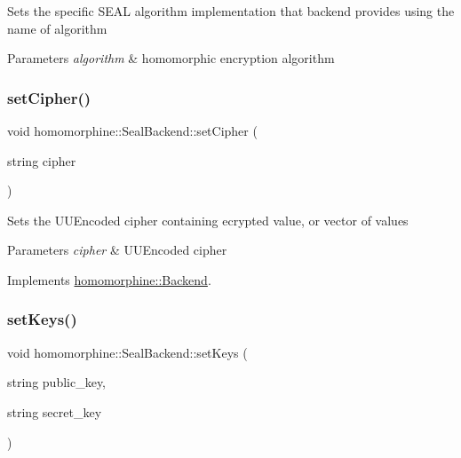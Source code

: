 Sets the specific S\+E\+AL algorithm implementation that backend provides using the name of algorithm


\begin{DoxyParams}{Parameters}
{\em algorithm} & homomorphic encryption algorithm \\
\hline
\end{DoxyParams}
\mbox{\label{classhomomorphine_1_1_seal_backend_a866b58e41809d68d4c6ed8c3afb27712}} 
\subsubsection{\texorpdfstring{setCipher()}{setCipher()}}
{\footnotesize\ttfamily void homomorphine\+::\+Seal\+Backend\+::set\+Cipher (\begin{DoxyParamCaption}\item[{string}]{cipher }\end{DoxyParamCaption})\hspace{0.3cm}{\ttfamily [virtual]}}

Sets the U\+U\+Encoded cipher containing ecrypted value, or vector of values


\begin{DoxyParams}{Parameters}
{\em cipher} & U\+U\+Encoded cipher \\
\hline
\end{DoxyParams}


Implements \mbox{\hyperlink{classhomomorphine_1_1_backend_a29f49f5c862cf090ac98ade663e67c64}{homomorphine\+::\+Backend}}.

\mbox{\label{classhomomorphine_1_1_seal_backend_a42afcc2823d616edc6be0e3950cf7196}} 
\subsubsection{\texorpdfstring{setKeys()}{setKeys()}}
{\footnotesize\ttfamily void homomorphine\+::\+Seal\+Backend\+::set\+Keys (\begin{DoxyParamCaption}\item[{string}]{public\+\_\+key,  }\item[{string}]{secret\+\_\+key }\end{DoxyParamCaption})\hspace{0.3cm}{\ttfamily [virtual]}}

